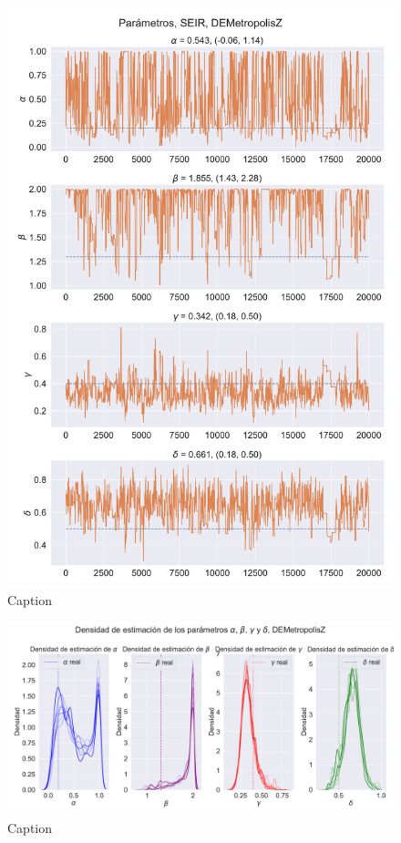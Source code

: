 \begin{figure}[h]
    \centering
    \includegraphics[width=0.8\linewidth]{img/content/chapter4/DEMetropolis_seir_params_trace.pdf}
    \caption{Caption}
    \label{fig:enter-label}
\end{figure}

\begin{figure}[h]
    \centering
    \includegraphics[width=0.8\linewidth]{img/content/chapter4/DEMetropolis_seir_params_density.pdf}
    \caption{Caption}
    \label{fig:enter-label}
\end{figure}

